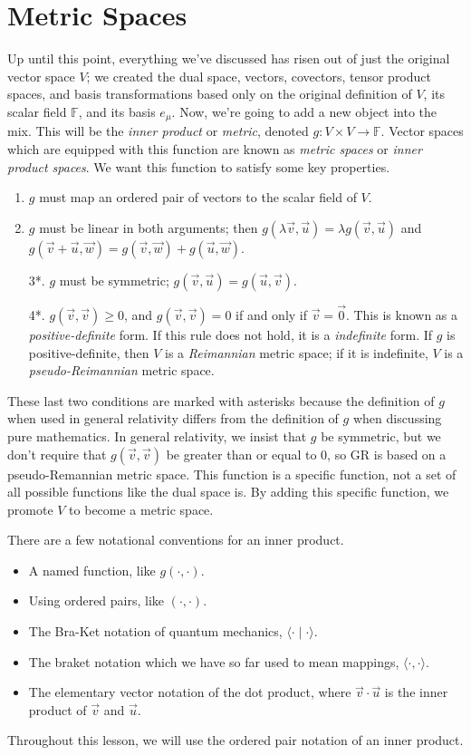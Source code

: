 \chapter{Metric Spaces}
Up until this point, everything we've discussed has risen out of just the original vector space $V$; we created the dual space, vectors, covectors, tensor product spaces, and basis transformations based only on the original definition of $V$, its scalar field $\mathbb{F}$, and its basis $e_\mu$.
Now, we're going to add a new object into the mix.
This will be the \emph{inner product} or \emph{metric}, denoted $g: V \times V \to \mathbb{F}$.
Vector spaces which are equipped with this function are known as \emph{metric spaces} or \emph{inner product spaces}. 
We want this function to satisfy some key properties.
\begin{enumerate}
    \item $g$ must map an ordered pair of vectors to the scalar field of $V$.
    \item $g$ must be linear in both arguments; then $g(\lambda\vec{v},\vec{u}) = \lambda g(\vec{v},\vec{u})$ and $g(\vec{v} + \vec{u},\vec{w}) = g(\vec{v},\vec{w}) + g(\vec{u},\vec{w})$.
    \item[3*.] $g$ must be symmetric; $g(\vec{v},\vec
    u) = g(\vec{u},\vec{v})$.
    \item[4*.] $g(\vec{v},\vec{v}) \geq 0$, and $g(\vec{v},\vec{v}) = 0$ if and only if $\vec{v} = \vec{0}$. This is known as a \emph{positive-definite} form. If this rule does not hold, it is a \emph{indefinite} form.
    If $g$ is positive-definite, then $V$ is a \emph{Reimannian} metric space; if it is indefinite, $V$ is a \emph{pseudo-Reimannian} metric space.
\end{enumerate}
These last two conditions are marked with asterisks because the definition of $g$ when used in general relativity differs from the definition of $g$ when discussing pure mathematics.
In general relativity, we insist that $g$ be symmetric, but we don't require that $g(\vec{v},\vec{v})$ be greater than or equal to 0, so GR is based on a pseudo-Remannian metric space.
This function is a specific function, not a set of all possible functions like the dual space is.
By adding this specific function, we promote $V$ to become a metric space.

There are a few notational conventions for an inner product.
\begin{itemize}
    \item A named function, like $g(\cdot,\cdot)$.
    \item Using ordered pairs, like $(\cdot, \cdot)$.
    \item The Bra-Ket notation of quantum mechanics, $\langle \cdot \mid \cdot \rangle$.
    \item The braket notation which we have so far used to mean mappings, $\langle \cdot, \cdot \rangle$.
    \item The elementary vector notation of the dot product, where $\vec{v}\cdot\vec{u}$ is the inner product of $\vec{v}$ and $\vec{u}$.
\end{itemize}
Throughout this lesson, we will use the ordered pair notation of an inner product.

